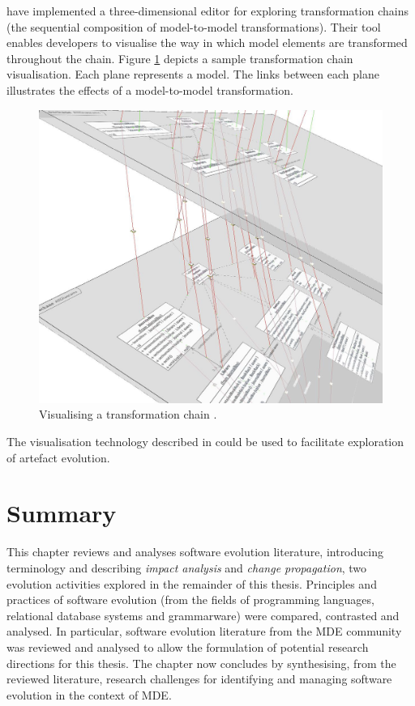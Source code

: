\cite{pilgrim08constructing} have implemented a three-dimensional editor for exploring transformation chains (the sequential composition of model-to-model transformations). Their tool enables developers to visualise the way in which model elements are transformed throughout the chain. Figure \ref{fig:transformation-chains} depicts a sample transformation chain visualisation. Each plane represents a model. The links between each plane illustrates the effects of a model-to-model transformation.

\begin{figure}[htbp]
  \begin{center}
    \leavevmode
    \includegraphics[scale=0.25]{3.LiteratureReview/images/transformation-chain.png}
  \end{center}
  \caption{Visualising a transformation chain \cite{pilgrim08constructing}.}
  \label{fig:transformation-chains}
\end{figure}

The visualisation technology described in \cite{pilgrim08constructing} could be used to facilitate exploration of artefact evolution.

\section{Summary}
\label{sec:literature_review_summary}
This chapter reviews and analyses software evolution literature, introducing terminology and describing \emph{impact analysis} and \emph{change propagation}, two evolution activities explored in the remainder of this thesis. Principles and practices of software evolution (from the fields of programming languages, relational database systems and grammarware) were compared, contrasted and analysed. In particular, software evolution literature from the MDE community was reviewed and analysed to allow the formulation of potential research directions for this thesis. The chapter now concludes by synthesising, from the reviewed literature, research challenges for identifying and managing software evolution in the context of MDE.

